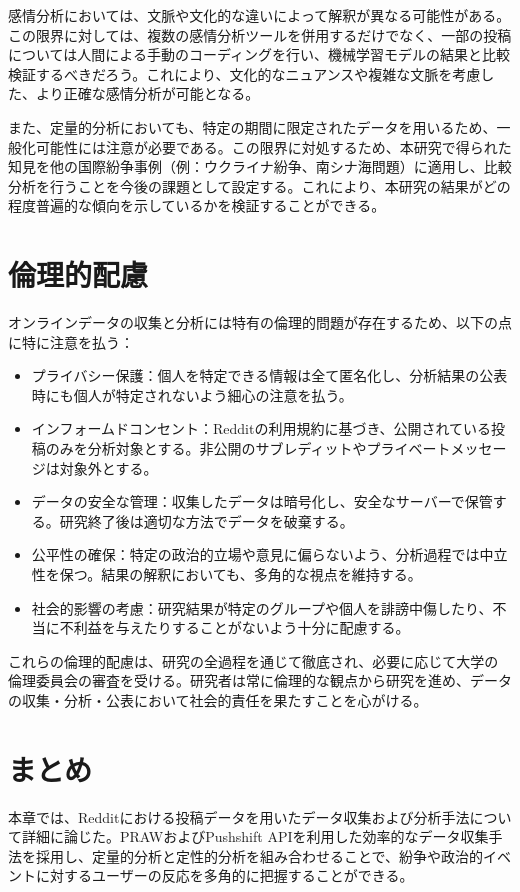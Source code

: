 \documentclass[11pt, a4j]{jreport}
\begin{document}
    感情分析においては、文脈や文化的な違いによって解釈が異なる可能性がある。この限界に対しては、複数の感情分析ツールを併用するだけでなく、一部の投稿については人間による手動のコーディングを行い、機械学習モデルの結果と比較検証するべきだろう。これにより、文化的なニュアンスや複雑な文脈を考慮した、より正確な感情分析が可能となる。

    また、定量的分析においても、特定の期間に限定されたデータを用いるため、一般化可能性には注意が必要である。この限界に対処するため、本研究で得られた知見を他の国際紛争事例（例：ウクライナ紛争、南シナ海問題）に適用し、比較分析を行うことを今後の課題として設定する。これにより、本研究の結果がどの程度普遍的な傾向を示しているかを検証することができる。

    \section{倫理的配慮}
    オンラインデータの収集と分析には特有の倫理的問題が存在するため、以下の点に特に注意を払う：

    \begin{itemize}
        \item プライバシー保護：個人を特定できる情報は全て匿名化し、分析結果の公表時にも個人が特定されないよう細心の注意を払う。

        \item インフォームドコンセント：Redditの利用規約に基づき、公開されている投稿のみを分析対象とする。非公開のサブレディットやプライベートメッセージは対象外とする。

        \item データの安全な管理：収集したデータは暗号化し、安全なサーバーで保管する。研究終了後は適切な方法でデータを破棄する。

        \item 公平性の確保：特定の政治的立場や意見に偏らないよう、分析過程では中立性を保つ。結果の解釈においても、多角的な視点を維持する。

        \item 社会的影響の考慮：研究結果が特定のグループや個人を誹謗中傷したり、不当に不利益を与えたりすることがないよう十分に配慮する。
    \end{itemize}

    これらの倫理的配慮は、研究の全過程を通じて徹底され、必要に応じて大学の倫理委員会の審査を受ける。研究者は常に倫理的な観点から研究を進め、データの収集・分析・公表において社会的責任を果たすことを心がける。

    \section{まとめ}
    本章では、Redditにおける投稿データを用いたデータ収集および分析手法について詳細に論じた。PRAWおよびPushshift
    APIを利用した効率的なデータ収集手法を採用し、定量的分析と定性的分析を組み合わせることで、紛争や政治的イベントに対するユーザーの反応を多角的に把握することができる。
\end{document}
